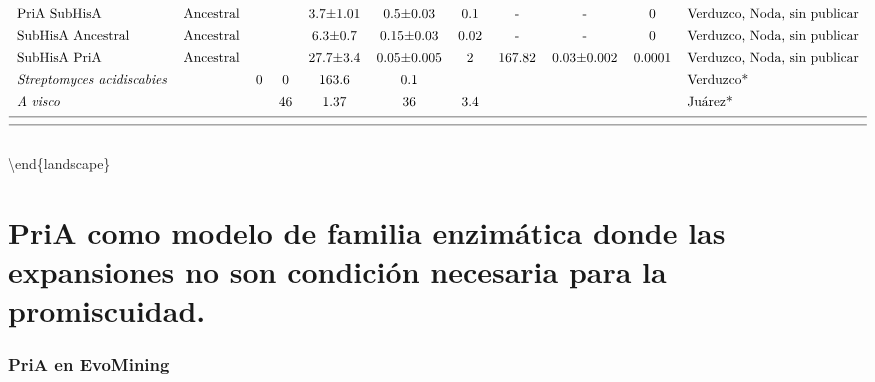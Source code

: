 \documentclass[12pt,twoside]{reedthesis}
\begin{document}
\[{\begin{tabular}{ l c r c c c c c c c l}
  PriA SubHisA&Ancestral&&&3.7±1.01&0.5±0.03&0.1&-&-&0&Verduzco, Noda, sin publicar\\ [1ex]    
  SubHisA Ancestral&Ancestral&&&6.3±0.7&0.15±0.03&0.02&-&-&0&Verduzco, Noda, sin publicar\\ [1ex]    
  SubHisA PriA&Ancestral&&&27.7±3.4&0.05±0.005&2&167.82&0.03±0.002&0.0001&Verduzco, Noda, sin publicar\\ [1ex]    
  \textit{Streptomyces} \textit{acidiscabies}&&0&0&163.6&0.1&&&&&Verduzco*\\ [1ex]  
  \textit{A} \textit{visco} &&&46&1.37&36&3.4&&&&Juárez*\\ [1ex]  
  \hline \\ [-1.5ex]
  \hline
  \end{tabular}
  }
  \]\\
  \textbackslash{}end\{landscape\} \normalsize
  
  \section{PriA como modelo de familia enzimática donde las expansiones no
  son condición necesaria para la
  promiscuidad.}\label{pria-como-modelo-de-familia-enzimatica-donde-las-expansiones-no-son-condicion-necesaria-para-la-promiscuidad.}
  
  \subsubsection{PriA en EvoMining}\label{pria-en-evomining}
  
\end{document}
